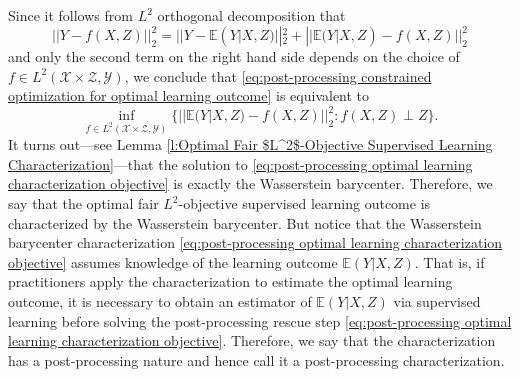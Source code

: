 \documentclass[twoside,11pt]{article}
\begin{document}
Since it follows from $L^2$ orthogonal decomposition that 
\begin{equation}
||Y - f(X,Z)||_2^2 = ||Y - \mathbb{E}(Y|X,Z)||_2^2 + ||\mathbb{E}(Y|X,Z) - f(X,Z)||_2^2
\end{equation}
and only the second term on the right hand side depends on the choice of $f \in L^2(\mathcal{X} \times \mathcal{Z},\mathcal{Y})$, we conclude that \eqref{eq:post-processing constrained optimization for optimal learning outcome} is equivalent to
\begin{equation} \label{eq:post-processing optimal learning characterization objective}
\inf_{f \in L^2(\mathcal{X} \times \mathcal{Z},\mathcal{Y})} \{||\mathbb{E}(Y|X,Z) - f(X,Z)||_2^2 : f(X,Z) \perp Z\}.
\end{equation}
It turns out---see Lemma \ref{l:Optimal Fair $L^2$-Objective Supervised Learning Characterization}---that the solution to \eqref{eq:post-processing optimal learning characterization objective} is exactly the Wasserstein barycenter. Therefore, we say that the optimal fair $L^2$-objective supervised learning outcome is characterized by the Wasserstein barycenter.  But notice that the Wasserstein barycenter characterization \eqref{eq:post-processing optimal learning characterization objective} assumes knowledge of the learning outcome $\mathbb{E}(Y|X,Z)$. That is, if practitioners apply the characterization to estimate the optimal learning outcome, it is necessary to obtain an estimator of $\mathbb{E}(Y|X,Z)$ via supervised learning before solving the post-processing rescue step \eqref{eq:post-processing optimal learning characterization objective}.  Therefore, we say that the characterization has a post-processing nature and hence call it a post-processing characterization. 
 
\end{document}
